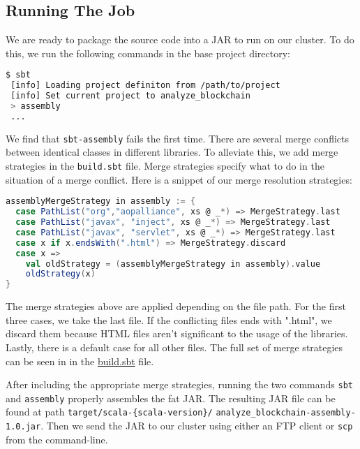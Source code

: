 \documentclass[9pt,twocolumn,twoside]{idsi}
\begin{document}
\subsection{Running The Job}
We are ready to package the source code into a JAR to run on our cluster. To do this, we run the following commands in the base project directory:

\begin{lstlisting}[language=bash]
 $ sbt
 [info] Loading project definiton from /path/to/project
 [info] Set current project to analyze_blockchain
 > assembly
 ...
\end{lstlisting}

We find that \lstinline{sbt-assembly} fails the first time. There are several merge conflicts between identical classes in different libraries. To alleviate this, we add merge strategies in the \lstinline{build.sbt} file. Merge strategies specify what to do in the situation of a merge conflict. Here is a snippet of our merge resolution strategies:

\begin{lstlisting}[language=Scala]
assemblyMergeStrategy in assembly := {
  case PathList("org","aopalliance", xs @ _*) => MergeStrategy.last
  case PathList("javax", "inject", xs @ _*) => MergeStrategy.last
  case PathList("javax", "servlet", xs @ _*) => MergeStrategy.last
  case x if x.endsWith(".html") => MergeStrategy.discard
  case x =>
    val oldStrategy = (assemblyMergeStrategy in assembly).value
    oldStrategy(x)
}
\end{lstlisting}

The merge strategies above are applied depending on the file path. For the first three cases, we take the last file. If the conflicting files ends with ".html", we discard them because HTML files aren't significant to the usage of the libraries. Lastly, there is a default case for all other files. The full set of merge strategies can be seen in in the \href{https://github.com/nishilshah17/idsi_bitcoin/blob/d2f1e0257ff684e99356de052eed1c6868ffe82f/analyze_blockchain/build.sbt#L14}{build.sbt} file.

After including the appropriate merge strategies, running the two commands \lstinline{sbt} and \lstinline{assembly} properly assembles the fat JAR. The resulting JAR file can be found at path \lstinline|target/scala-{scala-version}/| \lstinline|analyze_blockchain-assembly-1.0.jar|. Then we send the JAR to our cluster using either an FTP client or \lstinline{scp} from the command-line.
\end{document}
